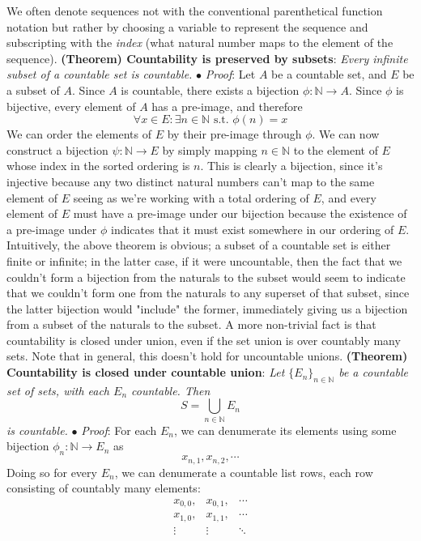 \documentclass{article}
\newcommand*{\tb}{\textbf}
\newcommand*{\ti}{\textit}
\newcommand*{\n}{\newline}
\newcommand*{\nn}{\newline \newline}
\newcommand*{\Pf}{\indent \ensuremath{\bullet} \textit{Proof}: }
\newcommand*{\N}{\mathbb{N}}
\newcommand*{\st}{\text{ s.t. }}
\begin{document}
\nn
We often denote sequences not with the conventional parenthetical function notation but rather by choosing a variable to represent the sequence and subscripting with the \ti{index} (what natural number maps to the element of the sequence).
\nn
\tb{(Theorem) Countability is preserved by subsets}: \ti{Every infinite subset of a countable set is countable.}
\n
\Pf Let $ A $ be a countable set, and $ E $ be a subset of $ A $. Since $ A $ is countable, there exists a bijection $ \phi: \N \rightarrow A $. Since $ \phi $ is bijective, every element of $ A $ has a pre-image, and therefore
    $$ \forall x \in E: \exists n \in \N \st \phi(n) = x $$
We can order the elements of $ E $ by their pre-image through $ \phi $. We can now construct a bijection $ \psi: \N \rightarrow E $ by simply mapping $ n \in \N $ to the element of $ E $ whose index in the sorted ordering is $ n $. This is clearly a bijection, since it's injective because any two distinct natural numbers can't map to the same element of $ E $ seeing as we're working with a total ordering of $ E $, and every element of $ E $ must have a pre-image under our bijection because the existence of a pre-image under $ \phi $ indicates that it must exist somewhere in our ordering of $ E $. \qedsymbol
\nn
Intuitively, the above theorem is obvious; a subset of a countable set is either finite or infinite; in the latter case, if it were uncountable, then the fact that we couldn't form a bijection from the naturals to the subset would seem to indicate that we couldn't form one from the naturals to any superset of that subset, since the latter bijection would "include" the former, immediately giving us a bijection from a subset of the naturals to the subset. A more non-trivial fact is that countability is closed under union, even if the set union is over countably many sets. Note that in general, this doesn't hold for uncountable unions.
\nn
\tb{(Theorem) Countability is closed under countable union}: \ti{Let $ \{ E_n \}_{n \in \N} $ be a countable set of sets, with each $ E_n $ countable. Then}
    $$ S = \bigcup_{n \in \N} E_n $$
\indent \ti{is countable.}
\n
\Pf For each $ E_n $, we can denumerate its elements using some bijection $ \phi_n: \N \rightarrow E_n $ as
    $$ x_{n, 1}, x_{n, 2}, \cdots $$
Doing so for every $ E_n $, we can denumerate a countable list rows, each row consisting of countably many elements:
    $$ \begin{matrix}
        x_{0, 0}, & x_{0, 1}, & \cdots \\
        x_{1, 0}, & x_{1, 1}, & \cdots \\
        \vdots & \vdots & \ddots \\
    \end{matrix} $$
\end{document}
